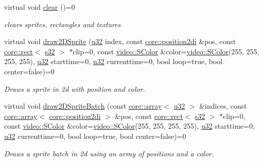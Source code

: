 \begin{DoxyCompactItemize}
virtual void \hyperlink{classirr_1_1gui_1_1IGUISpriteBank_a2305053e90c03ff274b637be23a5dd2a}{clear} ()=0
\begin{DoxyCompactList}\small\item\em clears sprites, rectangles and textures \end{DoxyCompactList}\item 
\mbox{\label{classirr_1_1gui_1_1IGUISpriteBank_aec335112ba4347aa50c5082e26fe2e9a}} 
virtual void \hyperlink{classirr_1_1gui_1_1IGUISpriteBank_aec335112ba4347aa50c5082e26fe2e9a}{draw2\+D\+Sprite} (\hyperlink{namespaceirr_a0416a53257075833e7002efd0a18e804}{u32} index, const \hyperlink{namespaceirr_1_1core_ace0f1379db5f9f5660456ec57ab78202}{core\+::position2di} \&pos, const \hyperlink{classirr_1_1core_1_1rect}{core\+::rect}$<$ \hyperlink{namespaceirr_ac66849b7a6ed16e30ebede579f9b47c6}{s32} $>$ $\ast$clip=0, const \hyperlink{classirr_1_1video_1_1SColor}{video\+::\+S\+Color} \&color=\hyperlink{classirr_1_1video_1_1SColor}{video\+::\+S\+Color}(255, 255, 255, 255), \hyperlink{namespaceirr_a0416a53257075833e7002efd0a18e804}{u32} starttime=0, \hyperlink{namespaceirr_a0416a53257075833e7002efd0a18e804}{u32} currenttime=0, bool loop=true, bool center=false)=0
\begin{DoxyCompactList}\small\item\em Draws a sprite in 2d with position and color. \end{DoxyCompactList}\item 
\mbox{\label{classirr_1_1gui_1_1IGUISpriteBank_adbfa01705a000248ea92149ad5e975d4}} 
virtual void \hyperlink{classirr_1_1gui_1_1IGUISpriteBank_adbfa01705a000248ea92149ad5e975d4}{draw2\+D\+Sprite\+Batch} (const \hyperlink{classirr_1_1core_1_1array}{core\+::array}$<$ \hyperlink{namespaceirr_a0416a53257075833e7002efd0a18e804}{u32} $>$ \&indices, const \hyperlink{classirr_1_1core_1_1array}{core\+::array}$<$ \hyperlink{namespaceirr_1_1core_ace0f1379db5f9f5660456ec57ab78202}{core\+::position2di} $>$ \&pos, const \hyperlink{classirr_1_1core_1_1rect}{core\+::rect}$<$ \hyperlink{namespaceirr_ac66849b7a6ed16e30ebede579f9b47c6}{s32} $>$ $\ast$clip=0, const \hyperlink{classirr_1_1video_1_1SColor}{video\+::\+S\+Color} \&color=\hyperlink{classirr_1_1video_1_1SColor}{video\+::\+S\+Color}(255, 255, 255, 255), \hyperlink{namespaceirr_a0416a53257075833e7002efd0a18e804}{u32} starttime=0, \hyperlink{namespaceirr_a0416a53257075833e7002efd0a18e804}{u32} currenttime=0, bool loop=true, bool center=false)=0
\begin{DoxyCompactList}\small\item\em Draws a sprite batch in 2d using an array of positions and a color. \end{DoxyCompactList}\end{DoxyCompactItemize}

